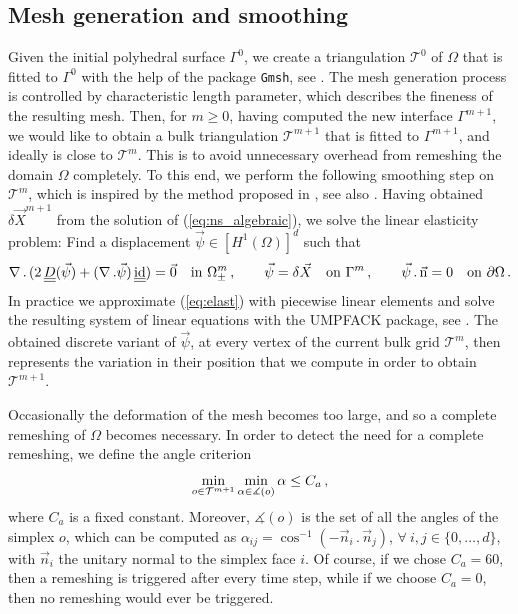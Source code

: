 \documentclass[a4paper,12pt,onecolumn]{article}
\newcommand{\sigmaO}{o}
\newcommand{\id}{\rm id}
\newcommand{\unitn}{\vec{\rm n}}
\newcommand{\mat}[1]{\underline{\underline{#1}}\rule{0pt}{0pt}}
\begin{document}
\subsection{Mesh generation and smoothing}\label{sec:smoothing}
Given the initial polyhedral surface $\Gamma^0$, we create a triangulation
$\mathcal{T}^0$ of $\Omega$ that is fitted to $\Gamma^0$ with the help of the
package \verb|Gmsh|, see \cite{GeuzaineR09}.
The mesh generation process is controlled by characteristic length
parameter, which describes the fineness of the resulting mesh.
Then, for $m \geq 0$, having computed the new interface $\Gamma^{m+1}$, we
would like to obtain a bulk triangulation $\mathcal{T}^{m+1}$ that is fitted to
$\Gamma^{m+1}$, and ideally is close to $\mathcal{T}^m$. This is to avoid
unnecessary overhead from remeshing the domain $\Omega$ completely.
To this end, we perform the following smoothing step on $\mathcal{T}^m$, which
is inspired by the method proposed in \cite{Ganesan06}, see also
\cite{GanesanT08}. Having obtained $\delta \vec X^{m+1}$ from the solution of
(\ref{eq:ns_algebraic}), we solve the linear elasticity problem: Find a
displacement $\vec\psi \in [H^1(\Omega)]^d$ such that
\begin{equation}
\nabla\,.\,(2\,\mat D(\vec\psi) + (\nabla\,.\vec\psi)\,\mat\id)
= \vec 0 \quad \mbox{in } \Omega_\pm^m\,,\qquad
\vec\psi = \delta \vec X \quad \mbox{on } \Gamma^m\,, \qquad
\vec\psi\,.\,\unitn = 0 \quad \mbox{on } \partial\Omega\,.
\label{eq:elast}
\end{equation}
In practice we approximate (\ref{eq:elast})
with piecewise linear elements and solve the resulting system of linear
equations with the UMPFACK package, see \cite{Davis04}. The obtained discrete
variant of $\vec\psi$, at every vertex of the current bulk grid
$\mathcal{T}^m$, then represents the variation in their position that we
compute in order to obtain $\mathcal{T}^{m+1}$.

Occasionally the deformation of the mesh becomes too large, and so a
complete remeshing of $\Omega$ becomes necessary. In order to detect the need
for a complete remeshing, we define the angle criterion
\begin{equation}\label{eq:angle_criterion}
\min_{\sigmaO\in {\cal T}^{m+1}}\min_{\alpha\in \measuredangle(\sigmaO)}\alpha
\leq C_a\,,
\end{equation}
where $C_a$ is a fixed constant. Moreover, $\measuredangle(\sigmaO)$ is the set
of all the angles of the simplex $\sigmaO$, which can be computed as
$\alpha_{ij}=\cos^{-1}(-\vec n_i\,.\,\vec n_j)$, $\forall\ i,j\in\{0,\dots,d\}$,
with $\vec n_i$ the unitary normal to the simplex face $i$. Of course, if we
chose $C_a=60$\textdegree, then a remeshing is triggered after every time step,
while if we choose $C_a = 0$\textdegree, then no remeshing would ever be
triggered.
\end{document}
